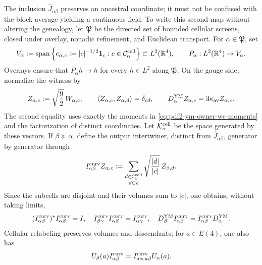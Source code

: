 The inclusion $\widehat J_{\alpha\beta}$ preserves an ancestral coordinate; it must not
be confused with the block average yielding a continuous field. To write
this second map without altering the genealogy, let $\mathfrak P$ be the directed set
of bounded cellular screens, closed under overlay, nonadic refinement, and
Euclidean transport. For $\alpha\in\mathfrak P$, set
\begin{equation}\label{eq:pdf2-ym-owner-cell-step-space}
 V_\alpha:=\operatorname{span}\left\{
 e_{\alpha,c}:=|c|^{-1/2}\mathbf1_c:
 c\in\mathcal C_\alpha^{\rm cell}\right\}
 \subset L^2(\mathbb R^4),
 \qquad P_\alpha:L^2(\mathbb R^4)\to V_\alpha.
\end{equation}
Overlays ensure that $P_\alpha h\to h$ for every $h\in L^2$ along
$\mathfrak P$. On the gauge side, normalize the witness by
\begin{equation}\label{eq:pdf2-ym-owner-normalized-cell-witness}
 Z_{\alpha,c}:=\sqrt{\frac92}\,W_{\alpha,c},
 \qquad
 \langle Z_{\alpha,c},Z_{\alpha,d}\rangle=\delta_{cd},
 \qquad
 D_\alpha^{\rm YM}Z_{\alpha,c}=3\kappa_{\rm av}Z_{\alpha,c}.
\end{equation}
The second equality uses exactly the moments in
\eqref{eq:pdf2-ym-owner-wc-moments} and the factorization of distinct coordinates.
Let $\mathcal K_\alpha^{\rm cell}$ be the space generated by these vectors. If
$\beta\succeq\alpha$, define the output intertwiner, distinct from
$\widehat J_{\alpha\beta}$, generator by generator through
\begin{equation}\label{eq:pdf2-ym-owner-block-intertwiner}
 I_{\alpha\beta}^{\rm curv}Z_{\alpha,c}
 :=\sum_{\substack{d\in\mathcal C_\beta^{\rm cell}\\d\subset c}}
       \sqrt{\frac{|d|}{|c|}}\,Z_{\beta,d}.
\end{equation}
Since the subcells are disjoint and their volumes sum to $|c|$, one obtains, without taking limits,
\begin{equation}\label{eq:pdf2-ym-owner-block-intertwiner-identities}
 (I_{\alpha\beta}^{\rm curv})^*I_{\alpha\beta}^{\rm curv}=I,
 \quad
 I_{\beta\gamma}^{\rm curv}I_{\alpha\beta}^{\rm curv}
 =I_{\alpha\gamma}^{\rm curv},
 \quad
 D_\beta^{\rm YM}I_{\alpha\beta}^{\rm curv}
 =I_{\alpha\beta}^{\rm curv}D_\alpha^{\rm YM}.
\end{equation}
Cellular relabeling preserves volumes and descendants; for $a\in E(4)$, one also has
\begin{equation}\label{eq:pdf2-ym-owner-block-e4-naturality}
 U_\beta(a)I_{\alpha\beta}^{\rm curv}
 =I_{a\alpha,a\beta}^{\rm curv}U_\alpha(a).
\end{equation}

